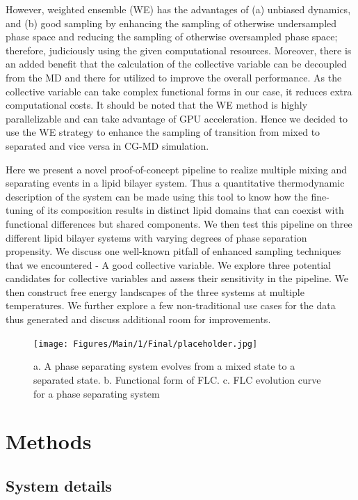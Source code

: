 \documentclass{biophys-new}
\begin{document}
However, weighted ensemble (WE) has the advantages of (a) unbiased dynamics, and (b) good sampling by enhancing the sampling of otherwise undersampled phase space and reducing the sampling of otherwise oversampled phase space; therefore, judiciously using the given computational resources\cite{Zuckerman2017}.
Moreover, there is an added benefit that the calculation of the collective variable can be decoupled from the MD and there for utilized to improve the overall performance.
As the collective variable can take complex functional forms in our case, it reduces extra computational costs.
It should be noted that the WE method is highly parallelizable and can take advantage of GPU acceleration\cite{Zwier2015}.
Hence we decided to use the WE strategy to enhance the sampling of transition from mixed to separated and vice versa in CG-MD simulation.

Here we present a novel proof-of-concept pipeline to realize multiple mixing and separating events in a lipid bilayer system. 
Thus a quantitative thermodynamic description of the system can be made using this tool to know how the fine-tuning of its composition results in distinct lipid domains that can coexist with functional differences but shared components.
We then test this pipeline on three different lipid bilayer systems with varying degrees of phase separation propensity.
We discuss one well-known pitfall of enhanced sampling techniques that we encountered - A good collective variable.
We explore three potential candidates for collective variables and assess their sensitivity in the pipeline.
We then construct free energy landscapes of the three systems at multiple temperatures.
We further explore a few non-traditional use cases for the data thus generated and discuss additional room for improvements.

\begin{figure}[hbt!]
\centering
\texttt{[image: Figures/Main/1/Final/placeholder.jpg]}
\caption{a. A phase separating system evolves from a mixed state to a separated state. b. Functional form of FLC. c. FLC evolution curve for a phase separating system}
\label{fig1:view}
\end{figure}

\section*{Methods}

\subsection*{System details}
\end{document}
